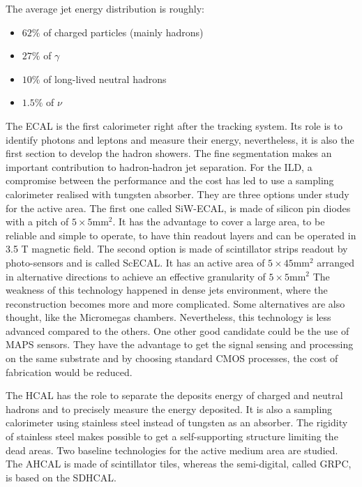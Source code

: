       The average jet energy distribution is roughly: 
      \begin{itemize}
        \item $62 \%$ of charged particles (mainly hadrons)
        \item $27 \%$ of $\gamma$
        \item $10 \%$ of long-lived neutral hadrons
        \item $1.5 \%$ of $\nu$
      \end{itemize}

      The \gls{ECAL} is the first calorimeter right after the tracking system.
      Its role is to identify photons and leptons and measure their energy, nevertheless, it is also the first section to develop the hadron showers.
      The fine segmentation makes an important contribution to hadron-hadron jet separation.
      For the \gls{ILD}, a compromise between the performance and the cost has led to use a sampling calorimeter realised with tungsten absorber.
      They are three options under study for the active area.
      The first one called SiW-ECAL, is made of silicon pin diodes with a pitch of $5 \times 5 \text{mm}^2$. 
      It has the advantage to cover a large area, to be reliable and simple to operate, to have thin readout layers and can be operated in 3.5 T magnetic field.
      The second option is made of scintillator strips readout by photo-sensors and is called ScECAL.
      It has an active area of $5 \times 45 \text{mm}^2$ arranged in alternative directions to achieve an effective granularity of $5 \times 5 \text{mm}^2$ 
      The weakness of this technology happened in dense jets environment, where the reconstruction becomes more and more complicated.
      Some alternatives are also thought, like the Micromegas chambers. Nevertheless, this technology is less advanced compared to the others.
      One other good candidate could be the use of \gls{MAPS} sensors.
      They have the advantage to get the signal sensing and processing on the same  substrate and by choosing standard CMOS processes, the cost of fabrication would be reduced.

      The  \gls{HCAL} has the role to separate the deposits energy of charged and neutral hadrons and to precisely measure the energy deposited.
      It is also a sampling calorimeter using stainless steel instead of tungsten as an absorber. 
      The rigidity of stainless steel makes possible to get a self-supporting structure limiting the dead areas.
      Two baseline technologies for the active medium area are studied.
      The  \gls{AHCAL} is made of scintillator tiles, whereas the semi-digital, called \gls{GRPC}, is based on the \gls{SDHCAL}.


